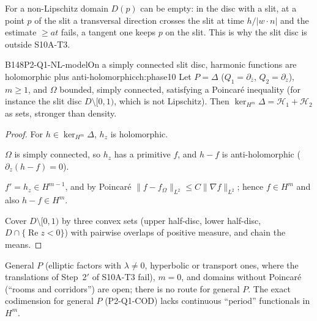 \begin{caution}[title={Where it stops}]
For a non-Lipschitz domain $D(p)$ can be empty: in the disc with a slit, at a point $p$ of the slit a transversal direction crosses the slit at time $h/|w\cdot n|$ and the estimate $\ge at$ fails, a tangent one keeps $p$ on the slit. This is why the slit disc is outside S10A-T3.
\end{caution}

\begin{dimcard}{B148}{P2-Q1-NL-model}{On a simply connected slit disc, harmonic functions are holomorphic plus anti-holomorphic}{\pw}{ch:phase10}
Let $P=\Delta$ ($Q_1=\partial_{\bar z}$, $Q_2=\partial_z$), $m\ge1$, and $\Omega$ bounded, simply connected, satisfying a Poincar\'e inequality (for instance the slit disc $D\setminus[0,1)$, which is not Lipschitz). Then $\ker_{H^m}\Delta=\mathcal H_1+\mathcal H_2$ as sets, stronger than density.
\end{dimcard}

\begin{proof}
For $h\in\ker_{H^m}\Delta$, $h_z$ is holomorphic.

$\Omega$ is simply connected, so $h_z$ has a primitive $f$, and $h-f$ is anti-holomorphic ($\partial_z(h-f)=0$).

$f'=h_z\in H^{m-1}$, and by Poincar\'e $\|f-f_\Omega\|_{L^2}\le C\|\nabla f\|_{L^2}$; hence $f\in H^m$ and also $h-f\in H^m$.

Cover $D\setminus[0,1)$ by three convex sets (upper half-disc, lower half-disc, $D\cap\{\operatorname{Re}z<0\}$) with pairwise overlaps of positive measure, and chain the means.

\end{proof}

\begin{caution}[title={What is left}]
General $P$ (elliptic factors with $\lambda\ne0$, hyperbolic or transport ones, where the translations of Step~2$'$ of S10A-T3 fail), $m=0$, and domains without Poincar\'e (``rooms and corridors'') are open; there is no route for general $P$. The exact codimension for general $P$ (P2-Q1-COD) lacks continuous ``period'' functionals in $H^m$.
\end{caution}


